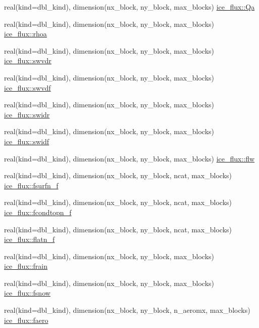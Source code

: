 \begin{DoxyCompactItemize}
\item 
real(kind=dbl\_\-kind), dimension(nx\_\-block, ny\_\-block, max\_\-blocks) \hyperlink{namespaceice__flux_af6a4cdca38aa449d2c23bd0faaead20a}{ice\_\-flux::Qa}
\item 
real(kind=dbl\_\-kind), dimension(nx\_\-block, ny\_\-block, max\_\-blocks) \hyperlink{namespaceice__flux_ab8b07cf5accff1bc998fda8a9255f504}{ice\_\-flux::rhoa}
\item 
real(kind=dbl\_\-kind), dimension(nx\_\-block, ny\_\-block, max\_\-blocks) \hyperlink{namespaceice__flux_af1a375e8ebfd339a67514570411f3562}{ice\_\-flux::swvdr}
\item 
real(kind=dbl\_\-kind), dimension(nx\_\-block, ny\_\-block, max\_\-blocks) \hyperlink{namespaceice__flux_a8c5ea2d2d5d2cd3a07df830e1b7df7c8}{ice\_\-flux::swvdf}
\item 
real(kind=dbl\_\-kind), dimension(nx\_\-block, ny\_\-block, max\_\-blocks) \hyperlink{namespaceice__flux_a9062bc1d6f167d11fe38ea7308cea20b}{ice\_\-flux::swidr}
\item 
real(kind=dbl\_\-kind), dimension(nx\_\-block, ny\_\-block, max\_\-blocks) \hyperlink{namespaceice__flux_aa83ef052badcc8ce13f5cdcfd363ae0d}{ice\_\-flux::swidf}
\item 
real(kind=dbl\_\-kind), dimension(nx\_\-block, ny\_\-block, max\_\-blocks) \hyperlink{namespaceice__flux_a5a996f0c777a83d0532daa407dae18e5}{ice\_\-flux::flw}
\item 
real(kind=dbl\_\-kind), dimension(nx\_\-block, ny\_\-block, ncat, max\_\-blocks) \hyperlink{namespaceice__flux_a248789dd1933e5c3a277f54582b46099}{ice\_\-flux::fsurfn\_\-f}
\item 
real(kind=dbl\_\-kind), dimension(nx\_\-block, ny\_\-block, ncat, max\_\-blocks) \hyperlink{namespaceice__flux_af7ddfda012c0a29dc4624f3914ea09f9}{ice\_\-flux::fcondtopn\_\-f}
\item 
real(kind=dbl\_\-kind), dimension(nx\_\-block, ny\_\-block, ncat, max\_\-blocks) \hyperlink{namespaceice__flux_a5538859203f81cabe03440a3b69f69a4}{ice\_\-flux::flatn\_\-f}
\item 
real(kind=dbl\_\-kind), dimension(nx\_\-block, ny\_\-block, max\_\-blocks) \hyperlink{namespaceice__flux_a82a0812de1a89016e9cdb1b60e3cab05}{ice\_\-flux::frain}
\item 
real(kind=dbl\_\-kind), dimension(nx\_\-block, ny\_\-block, max\_\-blocks) \hyperlink{namespaceice__flux_ada95784733af0019d97dc30baf7511b4}{ice\_\-flux::fsnow}
\item 
real(kind=dbl\_\-kind), dimension(nx\_\-block, ny\_\-block, n\_\-aeromx, max\_\-blocks) \hyperlink{namespaceice__flux_ad99dce71f61486e2450ba1fc5318abb9}{ice\_\-flux::faero}

\end{DoxyCompactItemize}
